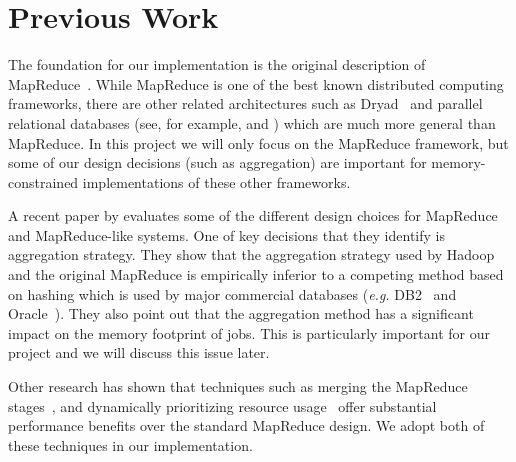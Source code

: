 \documentclass[10pt,letter,final,article,twocolumn]{article} %
\begin{document}

\section{Previous Work}

The foundation for our implementation is the original description of MapReduce~\citep{mapreduce08}. While MapReduce is one of the best known distributed computing frameworks, there are other related architectures such as Dryad~\citep{dryad07} and parallel relational databases (see, for example, \citet{db210} and \citet{teradata10}) which are much more general than MapReduce.  In this project we will only focus on the MapReduce framework, but some of our design decisions (such as aggregation) are important for memory-constrained implementations of these other frameworks.

A recent paper by \citet{yu2009distributed} evaluates some of the different design choices for MapReduce and MapReduce-like systems. One of key decisions that they identify is aggregation strategy.  They show that the aggregation strategy used by Hadoop and the original MapReduce is empirically inferior to a competing method based on hashing which is used by major commercial databases (\emph{e.g.} DB2~\citep{db210} and Oracle~\citep{oracle10}). They also point out that the aggregation method has a significant impact on the memory footprint of jobs. This is particularly important for our project and we will discuss this issue later.

Other research has shown that techniques such as merging the MapReduce stages~\citep{barrier10}, and dynamically prioritizing resource usage~\citep{sandholm09} offer substantial performance benefits over the standard MapReduce design. We adopt both of these techniques in our implementation.
\end{document}
